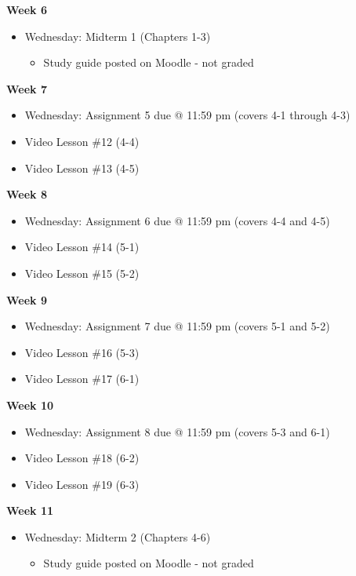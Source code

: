 \documentclass[12pt]{letter}
\newcommand{\?}{\stackrel{?}{=}}
\begin{document}
	\textbf{Week 6} \begin{itemize} \vspace{-12pt}
		\item Wednesday: Midterm 1 (Chapters 1-3) \begin{itemize}
			\item Study guide posted on Moodle - not graded
		\end{itemize}
	\end{itemize}

	\textbf{Week 7} \begin{itemize} \vspace{-12pt}
		\item Wednesday: Assignment 5 due @ 11:59 pm (covers 4-1 through 4-3)
		\item Video Lesson \#12 (4-4)
		\item Video Lesson \#13 (4-5)
	\end{itemize}

	\textbf{Week 8} \begin{itemize} \vspace{-12pt}
		\item Wednesday: Assignment 6 due @ 11:59 pm (covers 4-4 and 4-5)
		\item Video Lesson \#14 (5-1)
		\item Video Lesson \#15 (5-2)
	\end{itemize}

	\textbf{Week 9} \begin{itemize} \vspace{-12pt}
		\item Wednesday: Assignment 7 due @ 11:59 pm (covers 5-1 and 5-2)
		\item Video Lesson \#16 (5-3)
		\item Video Lesson \#17 (6-1)
	\end{itemize}
	
	\textbf{Week 10} \begin{itemize} \vspace{-12pt}
		\item Wednesday: Assignment 8 due @ 11:59 pm (covers 5-3 and 6-1)
		\item Video Lesson \#18 (6-2)
		\item Video Lesson \#19 (6-3)
	\end{itemize}

	\textbf{Week 11} \begin{itemize} \vspace{-12pt}
		\item Wednesday: Midterm 2 (Chapters 4-6) \begin{itemize}
			\item Study guide posted on Moodle - not graded
		\end{itemize}
	\end{itemize}
	
\end{document}
